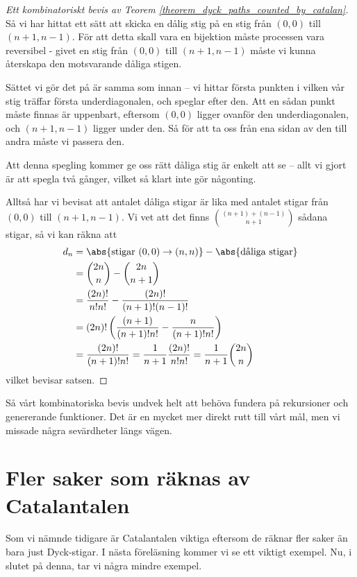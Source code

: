 \documentclass{tufte-handout}
\begin{document}
\begin{proof}[Ett kombinatoriskt bevis av Teorem \ref{theorem_dyck_paths_counted_by_catalan}]
    Så vi har hittat ett sätt att skicka en dålig stig på en stig från $(0,0)$ till $(n+1,n-1)$. För att detta skall vara en bijektion måste processen vara reversibel - givet en stig från $(0,0)$ till $(n+1,n-1)$ måste vi kunna återskapa den motsvarande dåliga stigen.

    Sättet vi gör det på är samma som innan -- vi hittar första punkten i vilken vår stig träffar första underdiagonalen, och speglar efter den. Att en sådan punkt måste finnas är uppenbart, eftersom $(0,0)$ ligger ovanför den underdiagonalen, och $(n+1,n-1)$ ligger under den. Så för att ta oss från ena sidan av den till andra måste vi passera den.

    Att denna spegling kommer ge oss rätt dåliga stig är enkelt att se -- allt vi gjort är att spegla två gånger, vilket så klart inte gör någonting.

    Alltså har vi bevisat att antalet dåliga stigar är lika med antalet stigar från $(0,0)$ till $(n+1,n-1)$. Vi vet att det finns $\binom{(n + 1) + (n - 1)}{n+1}$ sådana stigar, så vi kan räkna att
    \begin{align*}
        d_n &= \abs{\text{stigar }(0,0)\to(n,n)} - \abs{\text{dåliga stigar}}\\
        &= \binom{2n}{n} - \binom{2n}{n+1}\\
        &= \frac{(2n)!}{n!n!} - \frac{(2n)!}{(n+1)!(n-1)!}\\
        &= (2n)!\left(\frac{(n+1)}{(n+1)!n!} - \frac{n}{(n+1)!n!}\right)\\
        &= \frac{(2n)!}{(n+1)!n!} = \frac{1}{n+1}\frac{(2n)!}{n!n!} = \frac{1}{n+1}\binom{2n}{n}
    \end{align*}
    vilket bevisar satsen.
\end{proof}

Så vårt kombinatoriska bevis undvek helt att behöva fundera på rekursioner och genererande funktioner. Det är en mycket mer direkt rutt till vårt mål, men vi missade några sevärdheter längs vägen.

\section{Fler saker som räknas av Catalantalen}

Som vi nämnde tidigare är Catalantalen viktiga eftersom de räknar fler saker än bara just Dyck-stigar. I nästa föreläsning kommer vi se ett viktigt exempel. Nu, i slutet på denna, tar vi några mindre exempel.
\end{document}
